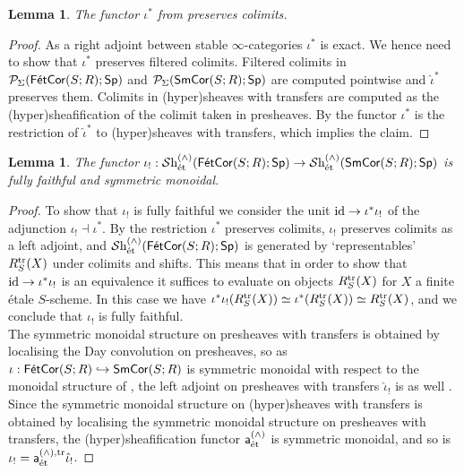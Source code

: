 \documentclass[reqno]{amsart}
\numberwithin{equation}{section}\theoremstyle{thms}
\newtheorem{lem}[equation]{Lemma}
\theoremstyle{defn}
\newcommand{\cP}{\mathcal{P}}
\newcommand{\tn}[1]{\textnormal{#1}}
\newcommand{\tsf}[1]{\textsf{\textup{#1}}}
\newcommand{\mcal}[1]{\mathcal{#1}}
\newcommand{\psigma}{\cP_{\Sigma}}
\newcommand{\sheaves}{\mcal{S}\tn{h}}
\newcommand{\spec}{\tsf{Sp}}
\newcommand{\corsms}[1]{\tsf{SmCor}(S;#1)}
\newcommand{\corfets}[1]{\tsf{FétCor}(S;#1)}
\begin{document}
\begin{lem}\label{lem:iotastar}
The functor $\iota^*$ from  preserves colimits.
\end{lem}
\begin{proof}
As a right adjoint between stable $\infty$-categories $\iota^*$ is exact. We hence need to show that $\iota^*$ preserves filtered colimits. Filtered colimits in $\psigma(\corfets{R};\spec)$ and $\psigma(\corsms{R};\spec)$ are computed pointwise and $\hat{\iota}^*$ preserves them. Colimits in (hyper)sheaves with transfers are computed as the (hyper)sheafification of the colimit taken in presheaves. By  the functor $\iota^*$ is the restriction of $\hat{\iota}^*$ to (hyper)sheaves with transfers, which implies the claim.
\end{proof}

\begin{lem}\label{lem:inclusionderived}
The functor $\iota_!: \sheaves_{\tn{ét}}^{(\wedge)}(\corfets{R};\spec) \to \sheaves_{\tn{ét}}^{(\wedge)}(\corsms{R};\spec)$ is fully faithful and symmetric monoidal.
\end{lem}
\begin{proof}
To show that $\iota_!$ is fully faithful we consider the unit $\tn{id} \to \iota^*\iota_!$ of the adjunction $\iota_! \dashv \iota^*$. By  the restriction $\iota^*$ preserves colimits, $\iota_!$ preserves colimits as a left adjoint, and $\sheaves^{(\wedge)}_{\tn{ét}}(\corfets{R};\spec)$ is generated by `representables' $R^{\tn{tr}}_S(X)$ under colimits and shifts. This means that in order to show that $\tn{id} \to \iota^*\iota_!$ is an equivalence it suffices to evaluate on objects $R^{\tn{tr}}_S(X)$ for $X$ a finite étale $S$-scheme. In this case we have $\iota^*\iota_!(R^{\tn{tr}}_S(X)) \simeq \iota^*(R_S^{\tn{tr}}(X)) \simeq R_S^{\tn{tr}}(X)$, and we conclude that $\iota_!$ is fully faithful. \\
The symmetric monoidal structure on presheaves with transfers is obtained by localising the Day convolution on presheaves, so as $\iota: \corfets{R} \hookrightarrow \corsms{R}$ is symmetric monoidal with respect to the monoidal structure of \cite[§9.2]{cd19}, the left adjoint on presheaves with transfers $\hat{\iota}_!$ is as well \cite[Proposition 3.6]{bs24}. Since the symmetric monoidal structure on (hyper)sheaves with transfers is obtained by localising the symmetric monoidal structure on presheaves with transfers, the (hyper)sheafification functor $\tsf{a}_{\tn{ét}}^{(\wedge)}$ is symmetric monoidal, and so is $\iota_! = \tsf{a}_{\tn{ét}}^{(\wedge), \tn{tr}}\hat{\iota}_!$.
\end{proof}
\end{document}
